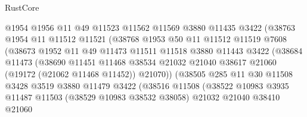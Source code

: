 \begin{lexlean}{RustCore}
\begin{coremodule}
                          @1954
                          @1956
                          @11
                          @49
                          @11523
                          @11562
                          @11569
                          @3880
                          @11435
                          @3422
                          (@38763
                            @1954
                            @11
                            @11512
                            @11521
                            (@38768
                              @1953
                              @50
                              @11
                              @11512
                              @11519
                              @7608
                              (@38673
                                @1952
                                @11
                                @49
                                @11473
                                @11511
                                @11518
                                @3880
                                @11443
                                @3422
                                (@38684
                                  @11473
                                  (@38690
                                    @11451
                                    @11468
                                    @38534
                                    @21032
                                    @21040
                                    @38617
                                    @21060
                                    (@19172 (@21062 @11468 @11452))
                                    @21070))
                                (@38505
                                  @285
                                  @11
                                  @30
                                  @11508
                                  @3428
                                  @3519
                                  @3880
                                  @11479
                                  @3422
                                  (@38516
                                    @11508
                                    (@38522
                                      @10983
                                      @3935
                                      @11487
                                      @11503
                                      (@38529 @10983 @38532 @38058)
                                      @21032
                                      @21040
                                      @38410
                                      @21060

\end{coremodule}
\end{lexlean}
